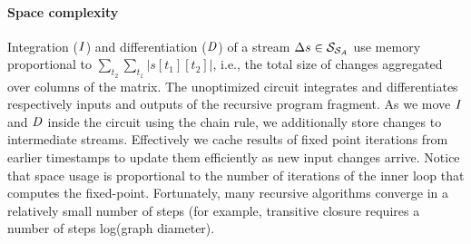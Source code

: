 \paragraph{Space complexity} Integration ($\mathit{I}$) and differentiation ($\mathit{D}$) of a
stream $\Delta s \in \mathcal{S}_{\mathcal{S}_{A}}$ use memory proportional to
$\sum_{t_2}\sum_{t_1}|s[t_1][t_2]|$, i.e., the total size of changes
aggregated over columns of the matrix.  The unoptimized circuit integrates
and differentiates respectively inputs and outputs of the recursive program
fragment.  As we move $\mathit{I}$ and $\mathit{D}$ inside the circuit using the chain rule, we
additionally store changes to intermediate streams.  Effectively we cache results of 
fixed point iterations from earlier timestamps to update them efficiently as new input changes arrive.
Notice that space usage is proportional to the number of iterations of the inner loop 
that computes the fixed-point.  
Fortunately, many recursive algorithms converge in a relatively small number of steps
(for example, transitive closure requires a number of steps  log(graph diameter).



